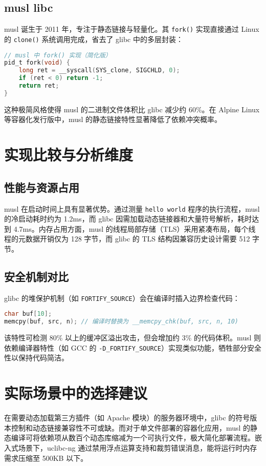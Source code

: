 \section{musl libc}
musl 诞生于 2011 年，专注于静态链接与轻量化。其 \verb!fork()! 实现直接通过 Linux 的 \verb!clone()! 系统调用完成，省去了 glibc 中的多层封装：\par
\begin{lstlisting}[language=c]
// musl 中 fork() 实现（简化版）
pid_t fork(void) {
    long ret = __syscall(SYS_clone, SIGCHLD, 0);
    if (ret < 0) return -1;
    return ret;
}
\end{lstlisting}
这种极简风格使得 musl 的二进制文件体积比 glibc 减少约 60\%{}。在 Alpine Linux 等容器化发行版中，musl 的静态链接特性显著降低了依赖冲突概率。\par
\chapter{实现比较与分析维度}
\section{性能与资源占用}
musl 在启动时间上具有显著优势。通过测量 \verb!hello world! 程序的执行流程，musl 的冷启动耗时约为 1.2ms，而 glibc 因需加载动态链接器和大量符号解析，耗时达到 4.7ms。内存占用方面，musl 的线程局部存储（TLS）采用紧凑布局，每个线程的元数据开销仅为 128 字节，而 glibc 的 TLS 结构因兼容历史设计需要 512 字节。\par
\section{安全机制对比}
glibc 的堆保护机制（如 \verb!FORTIFY_SOURCE!）会在编译时插入边界检查代码：\par
\begin{lstlisting}[language=c]
char buf[10];
memcpy(buf, src, n); // 编译时替换为 __memcpy_chk(buf, src, n, 10)
\end{lstlisting}
该特性可检测 80\%{} 以上的缓冲区溢出攻击，但会增加约 3\%{} 的代码体积。musl 则依赖编译器特性（如 GCC 的 \verb!-D_FORTIFY_SOURCE!）实现类似功能，牺牲部分安全性以保持代码简洁。\par
\chapter{实际场景中的选择建议}
在需要动态加载第三方插件（如 Apache 模块）的服务器环境中，glibc 的符号版本控制和动态链接兼容性不可或缺。而对于单文件部署的容器化应用，musl 的静态编译可将依赖项从数百个动态库缩减为一个可执行文件，极大简化部署流程。嵌入式场景下，uclibc-ng 通过禁用浮点运算支持和裁剪错误消息，能将运行时内存需求压缩至 500KB 以下。\par
